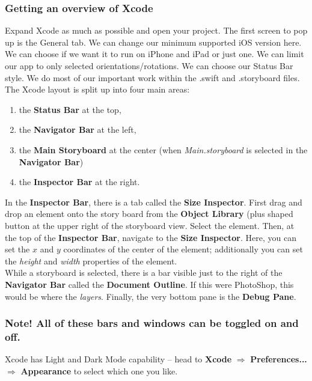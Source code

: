 \documentclass[11pt, letterpaper]{article}
\begin{document}
\subsubsection*{Getting an overview of Xcode}

Expand Xcode as much as possible and open your project. The first screen to pop up is the General tab.
We can change our minimum supported iOS version here. We can choose if we want it to run on iPhone
and iPad or just one. We can limit our app to only selected orientations/rotations. We can choose
our Status Bar style. We do most of our important work within the .swift and .storyboard files. \\

The Xcode layout is split up into four main  areas: 
\begin{enumerate}
    \itemsep0em
    \item{the \textbf{ Status Bar} at the top,} 
    \item{the \textbf{Navigator Bar} at the left,}
    \item{the \textbf{Main Storyboard} at the center (when \emph{Main.storyboard} is selected in the
        \textbf{Navigator Bar})}
    \item{the \textbf{Inspector Bar} at the right.}
\end{enumerate}

In the \textbf{Inspector Bar}, there is a tab called the \textbf{Size Inspector}. First drag and drop an
element onto the story board from the \textbf{Object Library} (plus shaped button at the upper
right of the storyboard view. Select the element. Then, at the top of the \textbf{Inspector Bar}, 
navigate to the \textbf{Size Inspector}. Here, you can set the $x$ and $y$ coordinates of the center
of the element; additionally you can set the \emph{height} and \emph{ width} properties 
of the element. \\

While a storyboard is selected, there is a bar visible just to the right of the \textbf{Navigator Bar} 
called the \textbf{Document Outline}. If this were PhotoShop, this would be where the \emph{layers}.
Finally, the very bottom pane is the \textbf{Debug Pane}.

\subsubsection*{Note! All of these bars and windows can be toggled on and off.}

Xcode has Light and Dark Mode capability -- head to  \textbf{Xcode} $\Rightarrow$ \textbf{Preferences...}
$\Rightarrow$ \textbf{Appearance} to select which one you like.
\end{document}
